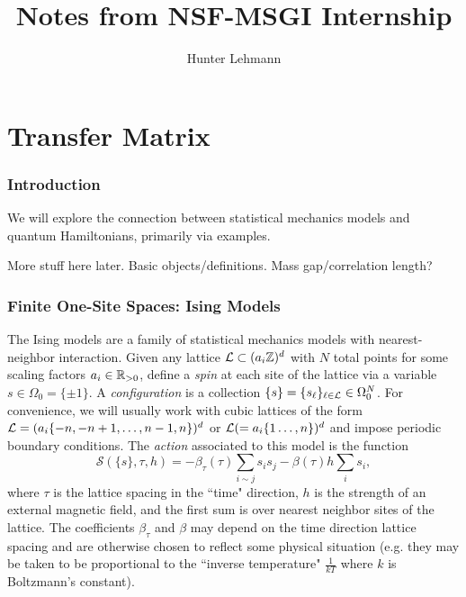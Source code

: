 \documentclass[11pt,reqno]{amsart}
\numberwithin{equation}{section}
\begin{document}
	
	\title{Notes from NSF-MSGI Internship}
	\author{Hunter Lehmann}
	\maketitle

\tableofcontents

	\part{Transfer Matrix}
	\section{Introduction}
	
	We will explore the connection between statistical mechanics models and quantum Hamiltonians, primarily via examples. 
	
	More stuff here later. Basic objects/definitions.
	Mass gap/correlation length?
	
	\section{Finite One-Site Spaces: Ising Models}
	
	The Ising models are a family of statistical mechanics models with nearest-neighbor interaction. 
	Given any lattice $\mathcal{L} \subset (a_i\mathbb{Z})^d$ with $N$ total points for some scaling factors $a_i \in \mathbb{R}_{>0}$, define a \emph{spin} at each site of the lattice via a variable $s \in \Omega_0=\{\pm 1\}$. 
	A \emph{configuration} is a collection $\{s\}=\{s_\ell\}_{\ell\in\mathcal{L}} \in \Omega_0^N$. 
	For convenience, we will usually work with cubic lattices of the form $\mathcal{L}=(a_i\{-n,-n+1,\ldots, n-1,n\})^d$ or $\mathcal{L}(=a_i\{1\ldots, n\})^d$ and impose periodic boundary conditions. 
	The \emph{action} associated to this model is the function 
	\[\mathcal{S}(\{s\},\tau, h)=-\beta_\tau(\tau)\sum_{i\sim j} s_is_j - \beta(\tau)h\sum_{i}s_i , \] 
	where $\tau$ is the lattice spacing in the ``time" direction, $h$ is the strength of an external magnetic field, and the first sum is over nearest neighbor sites of the lattice. 
	The coefficients $\beta_\tau$ and $\beta$ may depend on the time direction lattice spacing and are otherwise chosen to reflect some physical situation (e.g. they may be taken to be proportional to the ``inverse temperature" $\frac{1}{kT}$ where $k$ is Boltzmann's constant).
	
\end{document}
